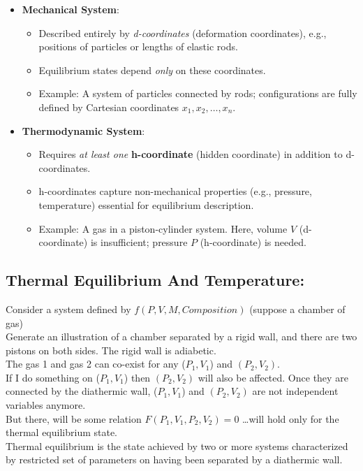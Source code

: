 \documentclass{article}
\theoremstyle{definition}
\begin{document}
\begin{itemize}
    \item \textbf{Mechanical System}: 
    \begin{itemize}
        \item Described entirely by \textit{d-coordinates} (deformation coordinates), e.g., positions of particles or lengths of elastic rods.
        \item Equilibrium states depend \textit{only} on these coordinates. 
        \item Example: A system of particles connected by rods; configurations are fully defined by Cartesian coordinates \( x_1, x_2, \ldots, x_n \).
    \end{itemize}
    
    \item \textbf{Thermodynamic System}:
    \begin{itemize}
        \item Requires \textit{at least one} \textbf{h-coordinate} (hidden coordinate) in addition to d-coordinates.
        \item h-coordinates capture non-mechanical properties (e.g., pressure, temperature) essential for equilibrium description.
        \item Example: A gas in a piston-cylinder system. Here, volume \( V \) (d-coordinate) is insufficient; pressure \( P \) (h-coordinate) is needed.
    \end{itemize}
\end{itemize}

\subsection{Thermal Equilibrium And Temperature:}
Consider a system defined by $f(P,V,M, Composition)$ (suppose a chamber of gas)\\
Generate an illustration of a chamber separated  by a rigid wall, and there are two pistons  on both sides.
The rigid wall is adiabetic.\\
The gas 1 and gas 2 can co-exist for any ($P_1, V_1$) and $(P_2, V_2)$.\\
If I do something on ($P_1, V_1$) then $(P_2, V_2)$ will also be affected.
Once they are connected by the diathermic wall, ($P_1, V_1$) and $(P_2, V_2)$ are not independent variables anymore.\\

But there, will be some relation $F(P_1, V_1,P_2, V_2) = 0$ \dots will hold only for the thermal equilibrium state.\\
Thermal equilibrium is the state achieved by two or more systems characterized by restricted set of parameters on having been separated by a diathermic wall.
\end{document}
